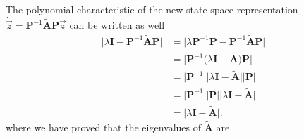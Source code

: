 \documentclass[11pt,a4paper,oneside]{book}
\numberwithin{equation}{section}
\theoremstyle{it}
\theoremstyle{definition}
\begin{document}
The polynomial characteristic of the new state space representation 
$\dot{\vec{z}}=\mathbf{P}^{-1}\tilde{\mathbf{A}}\mathbf{P}\vec{z}$ can be 
written as well
\begin{equation}\label{ss_representation_eq7}
	\begin{aligned}
		\Big|\lambda\mathbf{I}-\mathbf{P}^{-1}\tilde{\mathbf{A}}\mathbf{P}\Big| &= \Big|\lambda\mathbf{P}^{-1}\mathbf{P}-\mathbf{P}^{-1}\tilde{\mathbf{A}}\mathbf{P}\Big| \\[6pt]
		&= \Big|\mathbf{P}^{-1}\Big(\lambda\mathbf{I} -\tilde{\mathbf{A}}\Big)\mathbf{P}\Big| \\[6pt]
		&= \Big|\mathbf{P}^{-1}\Big|\Big|\lambda\mathbf{I} -\tilde{\mathbf{A}}\Big|\Big|\mathbf{P}\Big| \\[6pt]
		&= \Big|\mathbf{P}^{-1}\Big|\Big|\mathbf{P}\Big|\Big|\lambda\mathbf{I} -\tilde{\mathbf{A}}\Big| \\[6pt]
		&= \Big|\lambda\mathbf{I} -\tilde{\mathbf{A}}\Big|.
	\end{aligned}
\end{equation}
where we have proved that the eigenvalues of $\tilde{\mathbf{A}}$ are 
\end{document}

